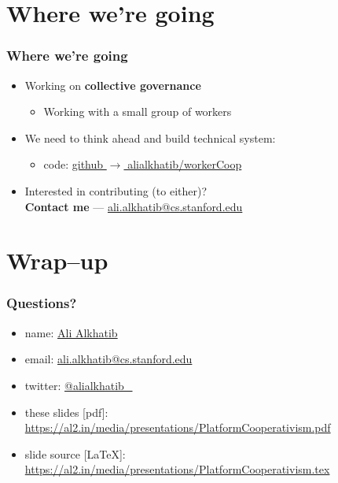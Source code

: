 \documentclass{beamer}
\begin{document}
\section[Moving forward]{Where we're going}
\begin{frame}
  \frametitle{Where we're going}
  \begin{itemize}
    \item
    Working on \textbf{collective governance}
    \begin{itemize}
      \item Working with a small group of workers
    \end{itemize}
    \item
    We need to think ahead and build technical system:
    \begin{itemize}
      \item code: \href{https://github.com/alialkhatib/workerCoop}{github $\rightarrow$ alialkhatib/workerCoop}
    \end{itemize}
    \item Interested in contributing (to either)?\\
    \textbf{Contact me} --- \href{mailto:ali.alkhatib@cs.stanford.edu}{ali.alkhatib@cs.stanford.edu}
  \end{itemize}
\end{frame}


\section[Questions, etc\ldots]{Wrap--up}
\begin{frame}
\frametitle{Questions?}
  \begin{itemize}
  \item
  name: \href{https://ali-alkhatib.com}{Ali Alkhatib}
  \item
  email: \href{mailto:ali.alkhatib@cs.stanford.edu}{ali.alkhatib@cs.stanford.edu}
  \item
  twitter: \href{https://twitter.com/alialkhatib_}{@alialkhatib\_}
  \item
  these slides [pdf]:
  {\footnotesize \url{https://al2.in/media/presentations/PlatformCooperativism.pdf}}
  \item
  slide source [\LaTeX]:
  {\footnotesize \url{https://al2.in/media/presentations/PlatformCooperativism.tex}}
  \end{itemize}
\end{frame}

\end{document}

